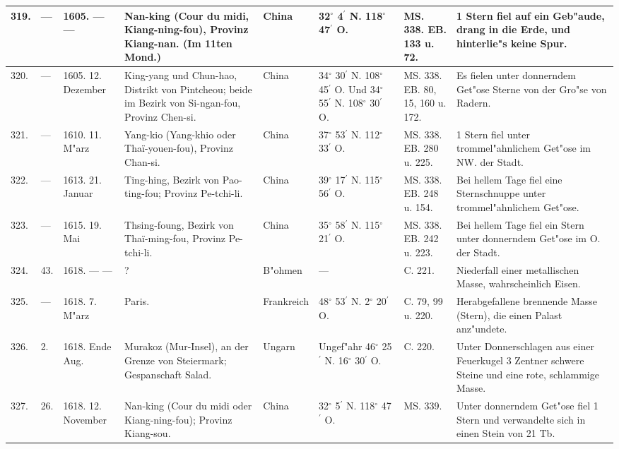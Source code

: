 \documentclass[a4paper, 8pt, oneside, polutonikogreek, german]{article}
\begin{document}
\begin{center}
\begin{longtable}{| p{4mm} | p{2mm} | p{15mm} | p{25mm} | p{16mm} | p{12mm} | p{13mm} | p{20mm} |}
        319. & --- & 1605. --- --- & Nan-king (Cour du midi, Kiang-ning-fou), Provinz Kiang-nan. (Im 11ten Mond.) & China & 32$^\circ$ 4$^\prime$ N. 118$^\circ$ 47$^\prime$ O. & MS. 338. EB. 133 u. 72. & 1 Stern fiel auf ein Geb"aude, drang in die Erde, und hinterlie"s keine Spur. \\ \hline
        320. & --- & 1605. 12. Dezember & King-yang und Chun-hao, Distrikt von Pintcheou; beide im Bezirk von Si-ngan-fou, Provinz Chen-si. & China & 34$^\circ$ 30$^\prime$ N. 108$^\circ$ 45$^\prime$ O. Und 34$^\circ$ 55$^\prime$ N. 108$^\circ$ 30$^\prime$ O. & MS. 338. EB. 80, 15, 160 u. 172. & Es fielen unter donnerndem Get"ose Sterne von der Gro"se von Radern. \\ \hline
        321. & --- & 1610. 11. M"arz & Yang-kio (Yang-khio oder Thaï-youen-fou), Provinz Chan-si. & China & 37$^\circ$ 53$^\prime$ N. 112$^\circ$ 33$^\prime$ O. & MS. 338. EB. 280 u. 225. & 1 Stern fiel unter trommel"ahnlichem Get"ose im NW. der Stadt. \\ \hline
        322. & --- & 1613. 21. Januar & Ting-hing, Bezirk von Pao-ting-fou; Provinz Pe-tchi-li. & China & 39$^\circ$ 17$^\prime$ N. 115$^\circ$ 56$^\prime$ O. & MS. 338. EB. 248 u. 154. & Bei hellem Tage fiel eine Sternschnuppe unter trommel"ahnlichem Get"ose. \\ \hline
        323. & --- & 1615. 19. Mai & Thsing-foung, Bezirk von Thaï-ming-fou, Provinz Pe-tchi-li. & China & 35$^\circ$ 58$^\prime$ N. 115$^\circ$ 21$^\prime$ O. & MS. 338. EB. 242 u. 223. & Bei hellem Tage fiel ein Stern unter donnerndem Get"ose im O. der Stadt. \\ \hline
        324. & 43. & 1618. --- --- & ? & B"ohmen & --- & C. 221. & Niederfall einer metallischen Masse, wahrscheinlich Eisen. \\ \hline
        325. & --- & 1618. 7. M"arz & Paris. & Frankreich & 48$^\circ$ 53$^\prime$ N. 2$^\circ$ 20$^\prime$ O. & C. 79, 99 u. 220. & Herabgefallene brennende Masse (Stern), die einen Palast anz"undete. \\ \hline
        326. & 2. & 1618. Ende Aug. & Murakoz (Mur-Insel), an der Grenze von Steiermark; Gespanschaft Salad. & Ungarn & Ungef"ahr 46$^\circ$ 25$^\prime$ N. 16$^\circ$ 30$^\prime$ O. & C. 220. & Unter Donnerschlagen aus einer Feuerkugel 3 Zentner schwere Steine und eine rote, schlammige Masse. \\ \hline
        327. & 26. & 1618. 12. November & Nan-king (Cour du midi oder Kiang-ning-fou); Provinz Kiang-sou. & China & 32$^\circ$ 5$^\prime$ N. 118$^\circ$ 47$^\prime$ O. & MS. 339. & Unter donnerndem Get"ose fiel 1 Stern und verwandelte sich in einen Stein von 21 Tb. \\ \hline

\end{longtable}
\end{center}
\end{document}
